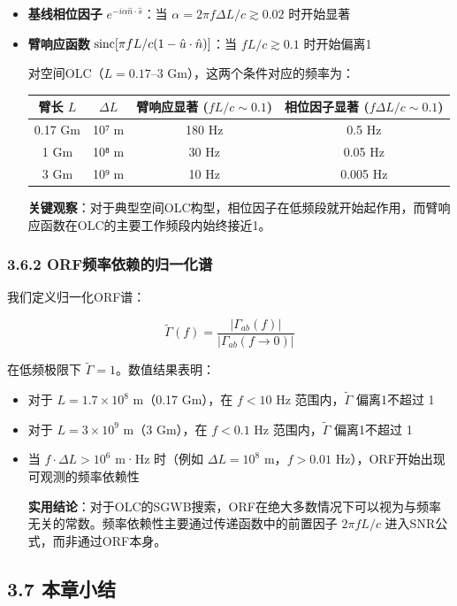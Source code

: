 \documentclass[12pt,a4paper]{article}
\begin{document}
\begin{itemize}
  \item[1] \textbf{基线相位因子} $e^{-i\alpha \hat{n}\cdot\hat{s}}$：当 $\alpha = 2\pi f \Delta L / c \gtrsim 0.02$ 时开始显著
  \item[2] \textbf{臂响应函数} ${\rm sinc}[\pi f L/c(1-\hat{u}\cdot\hat{n})]$：当 $fL/c \gtrsim 0.1$ 时开始偏离1

对空间OLC（$L = 0.17$–3 Gm），这两个条件对应的频率为：

\begin{tabular}{|c|c|c|c|}
\hline
臂长 $L$ & $\Delta L$ & 臂响应显著 ($fL/c \sim 0.1$) & 相位因子显著 ($f\Delta L/c \sim 0.1$) \\
\hline
0.17 Gm & 10⁷ m & 180 Hz & 0.5 Hz \\
1 Gm & 10⁸ m & 30 Hz & 0.05 Hz \\
3 Gm & 10⁹ m & 10 Hz & 0.005 Hz \\
\hline
\end{tabular}


\textbf{关键观察}：对于典型空间OLC构型，相位因子在低频段就开始起作用，而臂响应函数在OLC的主要工作频段内始终接近1。

\end{itemize}
\subsubsection{3.6.2 ORF频率依赖的归一化谱}


我们定义归一化ORF谱：

$$\tilde{\Gamma}(f) = \frac{|\Gamma_{ab}(f)|}{|\Gamma_{ab}(f \to 0)|}$$

在低频极限下 $\tilde{\Gamma} = 1$。数值结果表明：

\begin{itemize}
  \item 对于 $L = 1.7 \times 10^8$ m（0.17 Gm），在 $f < 10$ Hz 范围内，$\tilde{\Gamma}$ 偏离1不超过 1%
  \item 对于 $L = 3 \times 10^9$ m（3 Gm），在 $f < 0.1$ Hz 范围内，$\tilde{\Gamma}$ 偏离1不超过 1%
  \item 当 $f \cdot \Delta L > 10^6$ m·Hz 时（例如 $\Delta L = 10^8$ m，$f > 0.01$ Hz），ORF开始出现可观测的频率依赖性

\textbf{实用结论}：对于OLC的SGWB搜索，ORF在绝大多数情况下可以视为与频率无关的常数。频率依赖性主要通过传递函数中的前置因子 $2\pi f L/c$ 进入SNR公式，而非通过ORF本身。

\end{itemize}
\subsection{3.7 本章小结}
\end{document}
